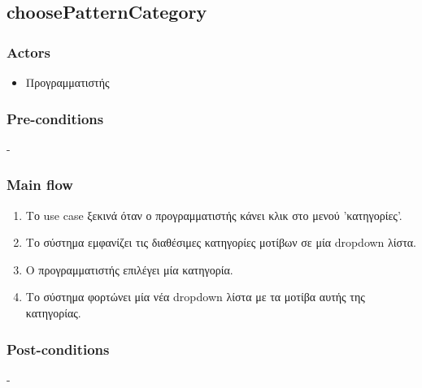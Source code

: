 \documentclass[../diploma_thesis.tex]{subfiles}
\begin{document}
\subsection{choosePatternCategory}
\subsubsection{Actors}
\begin{itemize}
\item  Προγραμματιστής
\end{itemize}
\subsubsection{Pre-conditions}
-
\subsubsection{Main flow}
\begin{enumerate}
\item Το use case ξεκινά όταν ο προγραμματιστής κάνει κλικ στο μενού 'κατηγορίες'.
\item Το σύστημα εμφανίζει τις διαθέσιμες κατηγορίες μοτίβων σε μία dropdown λίστα.
\item Ο προγραμματιστής επιλέγει μία κατηγορία.
\item Το σύστημα φορτώνει μία νέα dropdown λίστα με τα μοτίβα αυτής της κατηγορίας.
\end{enumerate}
\subsubsection{Post-conditions}
-
\end{document}
